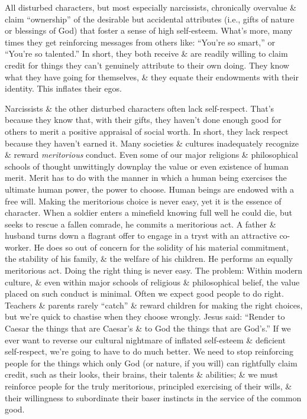 \documentclass{article}
\numberwithin{equation}{section}
\begin{document}
\begin{itemize}
	All disturbed characters, but most especially narcissists, chronically overvalue \& claim ``ownership'' of the desirable but accidental attributes (i.e., gifts of nature or blessings of God) that foster a sense of high self-esteem. What's more, many times they get reinforcing messages from others like: ``You're so smart,'' or ``You're so talented.'' In short, they both receive \& are readily willing to claim credit for things they can't genuinely attribute to their own doing. They know what they have going for themselves, \& they equate their endowments with their identity. This inflates their egos.
	
	Narcissists \& the other disturbed characters often lack self-respect. That's because they know that, with their gifts, they haven't done enough good for others to merit a positive appraisal of social worth. In short, they lack respect because they haven't earned it. Many societies \& cultures inadequately recognize \& reward \textit{meritorious} conduct. Even some of our major religions \& philosophical schools of thought unwittingly downplay the value or even existence of human merit. Merit has to do with the manner in which a human being exercises the ultimate human power, the power to choose. Human beings are endowed with a free will. Making the meritorious choice is never easy, yet it is the essence of character. When a soldier enters a minefield knowing full well he could die, but seeks to rescue a fallen comrade, he commits a meritorious act. A father \& husband turns down a flagrant offer to engage in a tryst with an attractive co-worker. He does so out of concern for the solidity of his material commitment, the stability of his family, \& the welfare of his children. He performs an equally meritorious act. Doing the right thing is never easy. The problem: Within modern culture, \& even within major schools of religious \& philosophical belief, the value placed on such conduct is minimal. Often we expect good people to do right. Teachers \& parents rarely ``catch'' \& reward children for making the right choices, but we're quick to chastise when they choose wrongly. Jesus said: ``Render to Caesar the things that are Caesar's \& to God the things that are God's.'' If we ever want to reverse our cultural nightmare of inflated self-esteem \& deficient self-respect, we're going to have to do much better. We need to stop reinforcing people for the things which only God (or nature, if you will) can rightfully claim credit, such as their looks, their brains, their talents \& abilities; \& we must reinforce people for the truly meritorious, principled exercising of their wills, \& their willingness to subordinate their baser instincts in the service of the common good.
	

\end{itemize}
\end{document}
